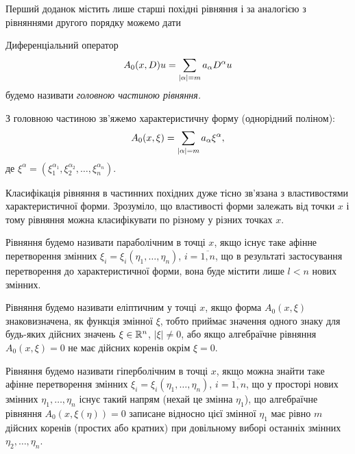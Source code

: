 Перший доданок містить лише старші похідні рівняння і за аналогією з рівняннями другого порядку можемо дати

\begin{definition}
	Диференціальний оператор 
	\begin{equation}
		A_0(x, D) u = \displaystyle\sum\limits_{|\alpha|=m}a_\alpha D^\alpha u
	\end{equation}
	будемо називати \it{головною} частиною рівняння.
\end{definition}

З головною частиною зв'яжемо характеристичну форму (однорідний поліном):
\begin{equation}
	A_0(x, \xi) = \displaystyle\sum\limits_{|\alpha|=m}a_\alpha \xi^\alpha,
\end{equation}
де $\xi^\alpha = (\xi_1^{\alpha_1}, \xi_2^{\alpha_2}, \ldots, \xi_n^{\alpha_n})$. \medskip

Класифікація рівняння в частинних похідних дуже тісно зв'язана з властивостями характеристичної форми. Зрозуміло, що властивості форми залежать від точки $x$ і тому рівняння можна класифікувати по різному у різних точках $x$. \medskip

\begin{definition}
	Рівняння будемо називати параболічним в точці $x$, якщо існує таке афінне перетворення змінних $\xi_i = \xi_i(\eta_1, \ldots, \eta_n)$, $i = \overline{1,n}$, що в результаті застосування перетворення до характеристичної форми, вона буде містити лише $l < n$ нових змінних.
\end{definition}

\begin{definition}
	Рівняння будемо називати еліптичним у точці $x$, якщо форма $A_0(x, \xi)$ знаковизначена, як функція змінної $\xi$, тобто приймає значення одного знаку для будь-яких дійсних значень $\xi \in \mathbb{R}^n$, $|\xi|\ne0$, або якщо алгебраїчне рівняння $A_0(x,\xi) = 0$ не має дійсних коренів окрім $\xi = 0$.
\end{definition}

\begin{definition}
	Рівняння будемо називати гіперболічним в точці $x$, якщо можна знайти таке афінне перетворення змінних $\xi_i = \xi_i(\eta_1, \ldots, \eta_n)$, $i = \overline{1,n}$, що у просторі нових змінних $\eta_1, \ldots, \eta_n$ існує такий напрям (нехай це змінна $\eta_1$), що алгебраїчне рівняння $A_0(x, \xi(\eta)) = 0$ записане відносно цієї змінної $\eta_1$ має рівно $m$ дійсних коренів (простих або кратних) при довільному виборі останніх змінних $\eta_2, \ldots, \eta_n$.
\end{definition}


